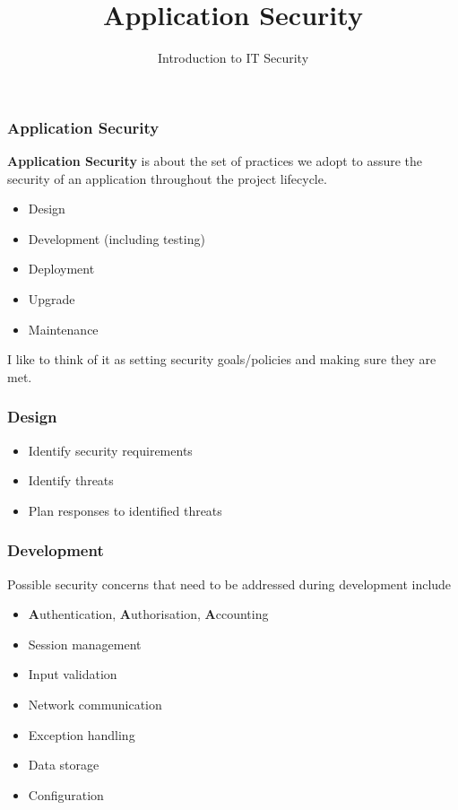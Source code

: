 \documentclass[10pt]{beamer}
\title{Application Security}
\author[IN618]{Introduction to IT Security}
\institute[Otago Polytechnic]{
  Otago Polytechnic \\
  Dunedin, New Zealand \\
}
\date{}
\begin{document}
\begin{frame}[plain]
  \titlepage
\end{frame}



\begin{frame}
  \frametitle{Application Security}

 \textbf{Application Security} is about the set of practices we adopt to 
 assure the security of an application throughout the project lifecycle.

 \begin{itemize}
  \item Design
  \item Development (including testing)
  \item Deployment
  \item Upgrade
  \item Maintenance
  \end{itemize}

  I like to think of it as setting security goals/policies and making sure 
  they are met.
\end{frame}


\begin{frame}
  \frametitle{Design}

 \begin{itemize}
  \item Identify security requirements
  \item Identify threats
  \item Plan responses to identified threats
  \end{itemize}
\end{frame}


\begin{frame}
  \frametitle{Development}

 Possible security concerns that need to be addressed during development include

 \begin{itemize}
	 \item \textbf{A}uthentication, \textbf{A}uthorisation, \textbf{A}ccounting
	 \item Session management
	 \item Input validation
	 \item Network communication
	 \item Exception handling
	 \item Data storage
	 \item Configuration

  \end{itemize}
\end{frame}
\end{document}
